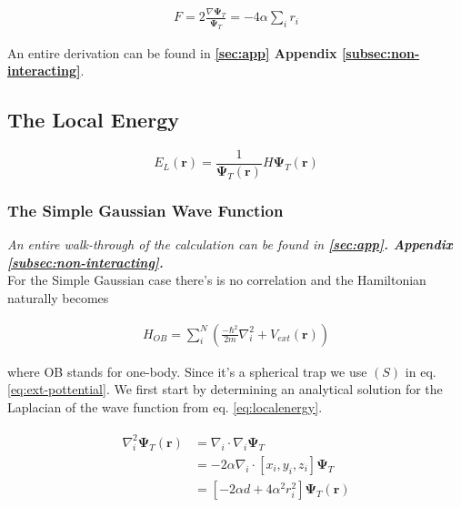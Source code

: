 \begin{align}
    F = 2\frac{\nabla \mathbf{\Psi}_T}{\mathbf{\Psi}_T} = -4\alpha\sum_i r_i
    \label{eq:quantum-force}
\end{align}

An entire derivation can be found in \textbf{\ref{sec:app} Appendix \ref{subsec:non-interacting}}.
 
\subsection{The Local Energy}

\begin{equation}
    E_L(\mathbf{r}) = \frac{1}{\mathbf{\Psi}_T (\mathbf{r})}H \mathbf{\Psi}_T (\mathbf{r})
    \label{eq:localenergy}
\end{equation}



\subsubsection{The Simple Gaussian Wave Function}

\textit{An entire walk-through of the calculation can be found in \textbf{\ref{sec:app}. Appendix \ref{subsec:non-interacting}.}} \\

For the Simple Gaussian case there's is no correlation and the Hamiltonian naturally becomes

\begin{align}
    H_{OB} = \sum_i^N \left( \frac{-\hbar^2}{2m}\nabla^2_i + V_{ext}(\mathbf{r})  \right)
    \label{eq:OB-Hamiltonian}
\end{align}

where OB stands for one-body. Since it's a spherical trap we use $(S)$ in eq. \ref{eq:ext-pottential}. We first start by determining an analytical solution for the Laplacian of the wave function from eq. \ref{eq:localenergy}.

\begin{align}
    \begin{split}
        \nabla_i^2 \mathbf{\Psi}_T (\mathbf{r}) &= \nabla_i \cdot \nabla_i \mathbf{\Psi}_T\\
        &= -2\alpha\nabla_i \cdot \left[x_i, y_i, z_i \right] \mathbf{\Psi}_T\\
        &= \left[ -2\alpha d + 4\alpha^2r_i^2 \right] \mathbf{\Psi}_T(\mathbf{r})
    \end{split}
\end{align}

